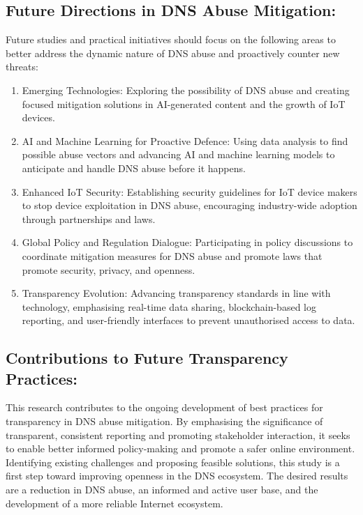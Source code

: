 \subsection{Future Directions in DNS Abuse Mitigation: }

Future studies and practical initiatives should focus on the following areas to better address the dynamic nature of DNS abuse and proactively counter new threats:

\begin{enumerate}
    \item Emerging Technologies: Exploring the possibility of DNS abuse and creating focused mitigation solutions in AI-generated content and the growth of IoT devices.

    \item AI and Machine Learning for Proactive Defence: Using data analysis to find possible abuse vectors and advancing AI and machine learning models to anticipate and handle DNS abuse before it happens.

    \item Enhanced IoT Security: Establishing security guidelines for IoT device makers to stop device exploitation in DNS abuse, encouraging industry-wide adoption through partnerships and laws.

    \item Global Policy and Regulation Dialogue: Participating in policy discussions to coordinate mitigation measures for DNS abuse and promote laws that promote security, privacy, and openness.

    \item Transparency Evolution: Advancing transparency standards in line with technology, emphasising real-time data sharing, blockchain-based log reporting, and user-friendly interfaces to prevent unauthorised access to data.

    
\end{enumerate}


\subsection{Contributions to Future Transparency Practices:}

This research contributes to the ongoing development of best practices for transparency in DNS abuse mitigation. By emphasising the significance of transparent, consistent reporting and promoting stakeholder interaction, it seeks to enable better informed policy-making and promote a safer online environment. Identifying existing challenges and proposing feasible solutions, this study is a first step toward improving openness in the DNS ecosystem. The desired results are a reduction in DNS abuse, an informed and active user base, and the development of a more reliable Internet ecosystem.


